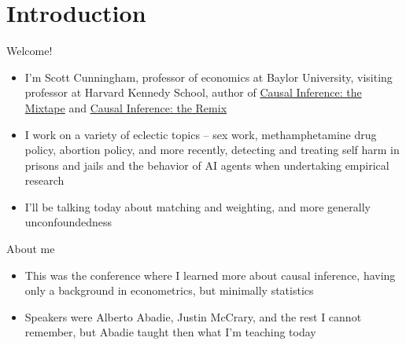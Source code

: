 \documentclass{beamer}
\begin{document}





\section{Introduction}

\begin{frame}{Welcome!}

  \begin{itemize}
	\item I'm Scott Cunningham, professor of economics at Baylor University, visiting professor at Harvard Kennedy School, author of \underline{Causal Inference: the Mixtape} and \underline{Causal Inference: the Remix}
	\item I work on a variety of eclectic topics -- sex work, methamphetamine drug policy, abortion policy, and more recently, detecting and treating self harm in prisons and jails and the behavior of AI agents when undertaking empirical research
	\item I'll be talking today about matching and weighting, and more generally unconfoundedness
  \end{itemize}

\end{frame}

\begin{frame}{About me}

\begin{itemize}


\item This was the conference where I learned more about causal inference, having only a background in econometrics, but minimally statistics
\item Speakers were Alberto Abadie, Justin McCrary, and the rest I cannot remember, but Abadie taught then what I'm teaching today

\end{itemize}

\end{frame}
\end{document}
